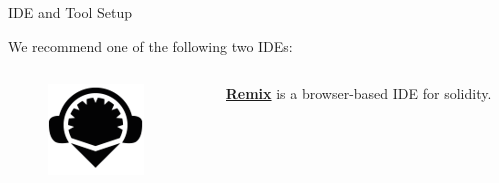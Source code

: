 \documentclass[]{beamer}
\begin{document}
\begin{frame}{IDE and Tool Setup}

	\begin{figure}
		\begingroup
			
		\endgroup
	\end{figure}
		
	We recommend one of the following two IDEs:\\
	
	\begin{columns}
		\begin{column}{0.1\textwidth}
			\begin{figure}		\includegraphics[width = \textwidth]{../assets/images/logo_remix.png}
			\end{figure}
		\end{column}
		\begin{column}{0.85\textwidth}
			\textbf{\href{https://remix.ethereum.org/}{\link Remix}} is a browser-based IDE for solidity.\\
		\end{column}
	\end{columns}
	

\end{frame}
\end{document}
